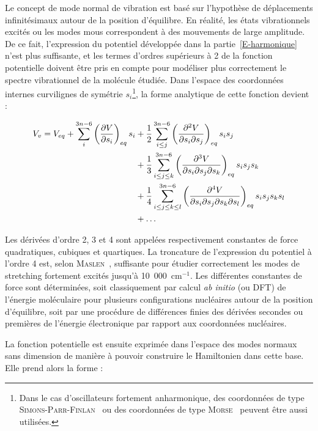 Le concept de mode normal de vibration est basé sur l'hypothèse de déplacements infinitésimaux autour de la position d'équilibre. En réalité, les états vibrationnels excités ou les modes mous correspondent à des mouvements de large amplitude. De ce fait, l'expression du potentiel développée dans la partie~\ref{E-harmonique} n'est plus suffisante, et les termes d'ordres supérieurs à 2 de la fonction potentielle doivent être pris en compte pour modéliser plus correctement le spectre vibrationnel de la molécule étudiée. Dans l'espace des coordonnées internes curvilignes de symétrie $s_i$\footnote{Dans le cas d'oscillateurs fortement anharmonique, des coordonnées de type \textsc{Simons-Parr-Finlan}~\cite{simons1973new} ou des coordonnées de type \textsc{Morse}~\cite{meyer1986abinitio} peuvent être aussi utilisées.}, la forme analytique de cette fonction devient :

\begin{align} \label{V-Taylor-si}
	V_v = V_{eq} + \sum^{3n-6}_i\left(\frac{\partial V}{\partial s_i}\right)_{eq} s_i &+ \frac{1}{2} \sum^{3n-6}_{i\leq j} \left(\frac{\partial^2 V}{\partial s_i \partial s_j}\right)_{eq} s_i s_j \\ \notag
	&+ \frac{1}{3} \sum^{3n-6}_{i\leq j\leq k} \left(\frac{\partial^3 V}{\partial s_i \partial s_j \partial s_k}\right)_{eq} s_i s_j s_k \\ \notag
	&+ \frac{1}{4} \sum^{3n-6}_{i\leq j\leq k\leq l} \left(\frac{\partial^4 V}{\partial s_i \partial s_j \partial s_k \partial s_l}\right)_{eq} s_i s_j s_k s_l \\ \notag
	&+ \ldots
\end{align}

Les dérivées d'ordre 2, 3 et 4 sont appelées respectivement constantes de force quadratiques, cubiques et quartiques. 
La troncature de l'expression du potentiel à l'ordre 4 est, selon \textsc{Maslen}~\cite{maslen1991higher}, suffisante pour étudier correctement les modes de stretching fortement excités jusqu'à 10~000~cm$^{-1}$.
Les différentes constantes de force sont déterminées, soit classiquement par calcul \textit{ab initio} (ou DFT) de l'énergie moléculaire pour plusieurs configurations nucléaires autour de la position d'équilibre, soit par une procédure de différences finies des dérivées secondes ou premières de l'énergie électronique par rapport aux coordonnées nucléaires.

La fonction potentielle est ensuite exprimée dans l'espace des modes normaux sans dimension de manière à pouvoir construire le Hamiltonien dans cette base. Elle prend alors la forme :

